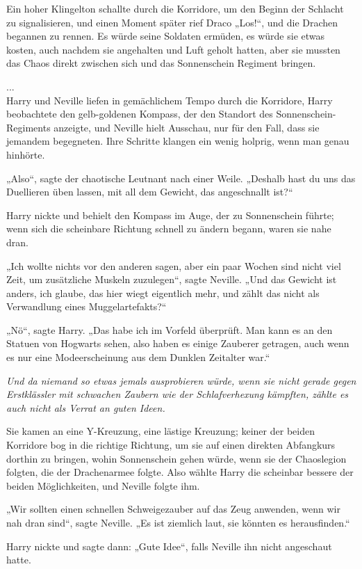 {Ein hoher Klingelton schallte durch die Korridore, um den Beginn der Schlacht zu signalisieren, und einen Moment später rief Draco „Los!“, und die Drachen begannen zu rennen. Es würde seine Soldaten ermüden, es würde sie etwas kosten, auch nachdem sie angehalten und Luft geholt hatten, aber sie mussten das Chaos direkt zwischen sich und das Sonnenschein Regiment bringen.

...\\ Harry und Neville liefen in gemächlichem Tempo durch die Korridore, Harry beobachtete den gelb-goldenen Kompass, der den Standort des Sonnenschein-Regiments anzeigte, und Neville hielt Ausschau, nur für den Fall, dass sie jemandem begegneten. Ihre Schritte klangen ein wenig holprig, wenn man genau hinhörte.

„Also“, sagte der chaotische Leutnant nach einer Weile. „Deshalb hast du uns das Duellieren üben lassen, mit all dem Gewicht, das angeschnallt ist?“

Harry nickte und behielt den Kompass im Auge, der zu Sonnenschein führte; wenn sich die scheinbare Richtung schnell zu ändern begann, waren sie nahe dran.

„Ich wollte nichts vor den anderen sagen, aber ein paar Wochen sind nicht viel Zeit, um zusätzliche Muskeln zuzulegen“, sagte Neville. „Und das Gewicht ist anders, ich glaube, das hier wiegt eigentlich mehr, und zählt das nicht als Verwandlung eines Muggelartefakts?“

„Nö“, sagte Harry. „Das habe ich im Vorfeld überprüft. Man kann es an den Statuen von Hogwarts sehen, also haben es einige Zauberer getragen, auch wenn es nur eine Modeerscheinung aus dem Dunklen Zeitalter war.“

\emph{Und da niemand so etwas jemals ausprobieren würde, wenn sie nicht gerade gegen Erstklässler mit schwachen Zaubern wie der Schlafverhexung kämpften, zählte es auch nicht als Verrat an guten Ideen.}

Sie kamen an eine Y-Kreuzung, eine lästige Kreuzung; keiner der beiden Korridore bog in die richtige Richtung, um sie auf einen direkten Abfangkurs dorthin zu bringen, wohin Sonnenschein gehen würde, wenn sie der Chaoslegion folgten, die der Drachenarmee folgte. Also wählte Harry die scheinbar bessere der beiden Möglichkeiten, und Neville folgte ihm.

„Wir sollten einen schnellen Schweigezauber auf das Zeug anwenden, wenn wir nah dran sind“, sagte Neville. „Es ist ziemlich laut, sie könnten es herausfinden.“

Harry nickte und sagte dann: „Gute Idee“, falls Neville ihn nicht angeschaut hatte.

}

